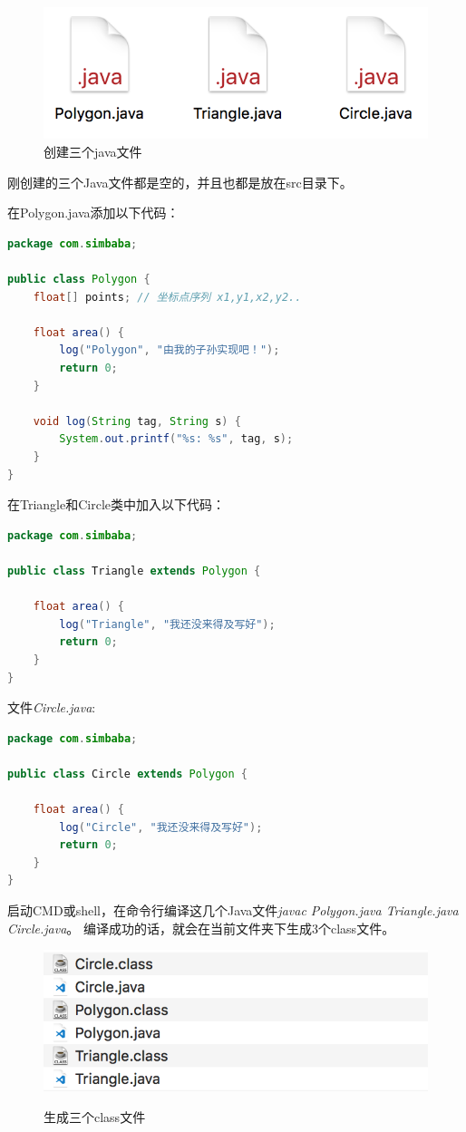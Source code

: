 \begin{figure}[!htb]
\centerline{\includegraphics[width=.25\figwidth]{images/java_step1.png}}
\label{fig:part1_oo_step1}
\caption{创建三个java文件}
\end{figure}
\noindent
刚创建的三个Java文件都是空的，并且也都是放在src目录下。

\noindent
在Polygon.java添加以下代码：
\begin{lstlisting}[language=Java,mathescape]
package com.simbaba;

public class Polygon {
    float[] points; // 坐标点序列 x1,y1,x2,y2..

    float area() {
        log("Polygon", "由我的子孙实现吧！");
        return 0;
    }

    void log(String tag, String s) {
        System.out.printf("%s: %s", tag, s);
    }
}
\end{lstlisting}
\noindent
在Triangle和Circle类中加入以下代码：
\begin{lstlisting}[language=Java,mathescape]
package com.simbaba;

public class Triangle extends Polygon {

    float area() {
        log("Triangle", "我还没来得及写好");
        return 0;
    }
}
\end{lstlisting}

\noindent 文件\emph{Circle.java}:
\begin{lstlisting}[language=Java,mathescape]
package com.simbaba;

public class Circle extends Polygon {

    float area() {
        log("Circle", "我还没来得及写好");
        return 0;
    }
}
\end{lstlisting}

\noindent
启动CMD或shell，在命令行编译这几个Java文件\emph{javac Polygon.java Triangle.java Circle.java}。
编译成功的话，就会在当前文件夹下生成3个class文件。

\begin{figure}[!htb]
\includegraphics[width=.3\figwidth]{images/java_class_file.png}
\label{fig:part1_class_file}
\caption{生成三个class文件}
\end{figure}

